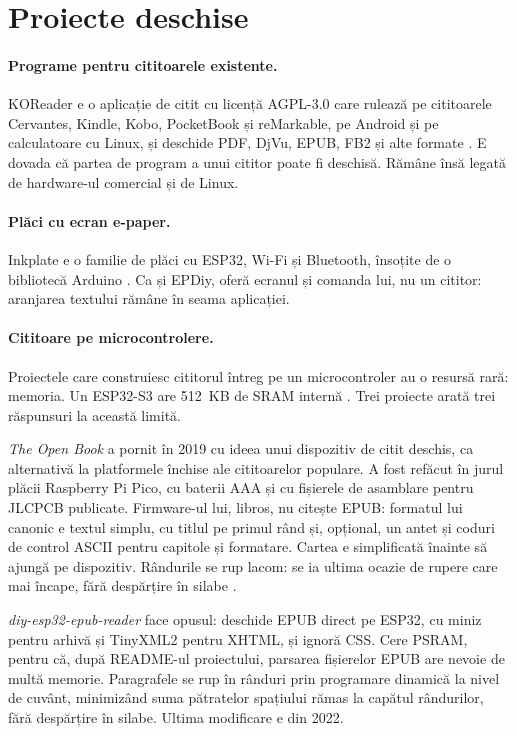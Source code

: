 \section{Proiecte deschise}
\label{sec:stadiu-deschise}

\paragraph{Programe pentru cititoarele existente.} KOReader e o aplicație de
citit cu licență AGPL-3.0 care rulează pe cititoarele Cervantes, Kindle, Kobo,
PocketBook și reMarkable, pe Android și pe calculatoare cu Linux, și deschide
PDF, DjVu, EPUB, FB2 și alte formate \citep{koreader}. E dovada că partea de
program a unui cititor poate fi deschisă. Rămâne însă legată de hardware-ul
comercial și de Linux.

\paragraph{Plăci cu ecran e-paper.} Inkplate e o familie de plăci cu ESP32,
Wi-Fi și Bluetooth, însoțite de o bibliotecă Arduino \citep{inkplate}. Ca și
EPDiy, oferă ecranul și comanda lui, nu un cititor: aranjarea textului rămâne
în seama aplicației.

\paragraph{Cititoare pe microcontrolere.} Proiectele care construiesc
cititorul întreg pe un microcontroler au o resursă rară: memoria. Un ESP32-S3
are 512~KB de SRAM internă \citep{esp32s3}. Trei proiecte arată trei răspunsuri
la această limită.

\emph{The Open Book} \citep{openbook} a pornit în 2019 cu ideea unui
dispozitiv de citit deschis, ca alternativă la platformele închise ale
cititoarelor populare. A fost refăcut în jurul plăcii Raspberry Pi Pico, cu
baterii AAA și cu fișierele de asamblare pentru JLCPCB publicate. Firmware-ul
lui, libros, nu citește EPUB: formatul lui canonic e textul simplu, cu titlul
pe primul rând și, opțional, un antet și coduri de control ASCII pentru
capitole și formatare. Cartea e simplificată înainte să ajungă pe dispozitiv.
Rândurile se rup lacom: se ia ultima ocazie de rupere care mai încape, fără
despărțire în silabe \citep{libros}.

\emph{diy-esp32-epub-reader} \citep{atomic14} face opusul: deschide EPUB direct
pe ESP32, cu miniz pentru arhivă și TinyXML2 pentru XHTML, și ignoră CSS. Cere
PSRAM, pentru că, după README-ul proiectului, parsarea fișierelor EPUB are
nevoie de multă memorie. Paragrafele se rup în rânduri prin programare
dinamică la nivel de cuvânt, minimizând suma pătratelor spațiului rămas la
capătul rândurilor, fără despărțire în silabe. Ultima modificare e din 2022.

